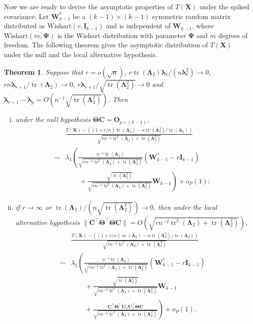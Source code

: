 \documentclass[12pt]{article} %
\DeclareMathOperator{\mytr}{tr}
\newcommand{\bX}{\mathbf{X}}
\newcommand{\bC}{\mathbf{C}}
\newcommand{\bO}{\mathbf{O}}
\newcommand{\bI}{\mathbf{I}}
\newcommand{\bU}{\mathbf{U}}
\newcommand{\bW}{\mathbf{W}}
\newcommand{\bfsym}[1]{\ensuremath{\boldsymbol{#1}}}
\def\blambda {\bfsym {\lambda}}
\def\bLambda {\bfsym {\Lambda}}
\def\bTheta {\bfsym {\Theta}}
\def\bPsi {\bfsym {\Psi}}
\newtheorem{theorem}{Theorem}
\theoremstyle{definition}
\begin{document}
Now we are ready to derive the asymptotic properties of $T(\bX)$ under the spiked covariance.
Let $\bW^*_{k-1}$ be a $(k-1)\times (k-1)$ symmetric random matrix distributed as $\textrm{Wishart}(r,\bI_{k-1})$ and is independent of $\bW_{k-1}$, where $\textrm{Wishart}(m,\bPsi)$ is the Wishart distribution with parameter $\bPsi$ and $m$ degrees of freedom.
The following theorem gives the asymptotic distribution of $T(\bX)$ under the null and the local alternative hypothesis.
\begin{theorem}\label{thm1}
    Suppose that $r=o(\sqrt{n})$, $r\mytr(\bLambda_2)\blambda_1/(n\blambda_r^2)\to 0$, $rn\blambda_{r+1} /\mytr(\bLambda_2)\to 0$,
    $r\blambda_{r+1}/\sqrt{\mytr(\bLambda_2^2)}\to 0$ and $\blambda_{r+1}-\blambda_p=O(n^{-1}\sqrt{\mytr(\bLambda_2^2)})$.
    Then
    \begin{enumerate}[(i)]
        \item 
            under the null hypothesis $\bTheta \bC=\bO_{p\times (k-1)}$,
\begin{equation*}
    \begin{split}
&
\frac{
    T(\bX)
    -
    \left((1+r/n)\mytr(\bLambda_2)-n\mytr(\bLambda_2^2)/\mytr(\bLambda_2)\right)
}{
    \sqrt{
        rn^{-2}\mytr^2(\bLambda_2)+ 
        \mytr(\bLambda_2^2)
    }
}
\\
\sim &
\lambda_1
\left(
\frac{
    n^{-1} \mytr(\bLambda_2)
}{
    \sqrt{
        rn^{-2} \mytr^2 (\bLambda_2) + \mytr(\bLambda_2^2)
    }
}
(\bW_{k-1}^* - r\bI_{k-1})
\right.
\\
&\quad\quad+
\left.
\frac{
    \sqrt{\mytr(\bLambda_2^2)}
}{
    \sqrt{
        rn^{-2} \mytr^2 (\bLambda_2) + \mytr(\bLambda_2^2)
    }
}
\bW_{k-1}
\right)
+o_P(1);
    \end{split}
\end{equation*}
        \item
            if $r\to \infty$ or $\mytr(\bLambda_2)/(n \sqrt{\mytr(\bLambda_2^2)})\to 0$, then under the local alternative hypothesis $\|\bC^\top \bTheta^\top \bTheta \bC\|=O(\sqrt{
        rn^{-2} \mytr^2 (\bLambda_2) + \mytr(\bLambda_2^2)
            })$,
\begin{equation*}
    \begin{split}
&
\frac{
    T(\bX)
    -
    \left((1+r/n)\mytr(\bLambda_2)-n\mytr(\bLambda_2^2)/\mytr(\bLambda_2)\right)
}{
    \sqrt{
        rn^{-2}\mytr^2(\bLambda_2)+ 
        \mytr(\bLambda_2^2)
    }
}
\\
\sim &
\lambda_1
\left(
\frac{
    n^{-1} \mytr(\bLambda_2)
}{
    \sqrt{
        rn^{-2} \mytr^2 (\bLambda_2) + \mytr(\bLambda_2^2)
    }
}
(\bW_{k-1}^* - r\bI_{k-1})
\right.
\\
&
\quad\quad
+
\frac{
    \sqrt{\mytr(\bLambda_2^2)}
}{
    \sqrt{
        rn^{-2} \mytr^2 (\bLambda_2) + \mytr(\bLambda_2^2)
    }
}
\bW_{k-1}
\\
&
\quad\quad
+\left.
\frac{
    \bC^\top \bTheta^\top \bU_2 \bU_2^\top \bTheta \bC
}{
    \sqrt{
        rn^{-2} \mytr^2 (\bLambda_2) + \mytr(\bLambda_2^2)
    }
}
\right)
+o_P(1).
    \end{split}
\end{equation*}
    \end{enumerate}
\end{theorem}
\end{document}
